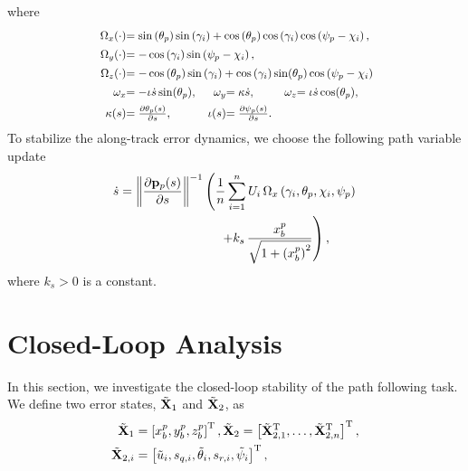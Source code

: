 where
\begin{subequations}
    \begin{align}
        \scale[0.90]{\Omega_x(\cdot)} & \mathrlap{\scale[0.90]{= \sin\left(\theta_p\right)\sin\left(\gamma_i\right) + \cos\left(\theta_p\right)\cos\left(\gamma_i\right)\cos\left(\psi_p-\chi_i\right),}} \\
        \scale[0.90]{\Omega_y(\cdot)} & \mathrlap{\scale[0.90]{= -\cos\left(\gamma_i\right)\sin\left(\psi_p - \chi_i\right),}} \\
        \scale[0.90]{\Omega_z(\cdot)} & \mathrlap{\scale[0.90]{=-\cos\left(\theta_p\right)\sin\left(\gamma_i\right) + \cos\left(\gamma_i\right)\sin(\theta_p)\cos\left(\psi_p-\chi_i\right)}} \\
        \scale[0.90]{\omega_x} & \scale[0.90]{= -\iota\dot{s}\sin(\theta_p),} &
        \scale[0.90]{\omega_y} & \scale[0.90]{= \kappa\dot{s},} &
        \scale[0.90]{\omega_z} & \scale[0.90]{= \iota\dot{s}\cos(\theta_p),} \\
        \scale[0.90]{\kappa(s)} & \scale[0.90]{= \frac{\partial \theta_p(s)}{\partial s},} &
        \scale[0.90]{\iota(s)} & \scale[0.90]{= \frac{\partial \psi_p(s)}{\partial s}.}
    \end{align}
\end{subequations}
To stabilize the along-track error dynamics, we choose the following path variable update 
\begin{equation}
    \begin{split}
        \dot{s} &= \left\|\frac{\partial \mathbf{p}_p(s)}{\partial s}\right\|^{-1} \left( \frac{1}{n}\sum_{i=1}^n U_i\,\Omega_x\left(\gamma_i, \theta_p, \chi_i, \psi_p\right)\right. \\
        & \qquad \qquad \qquad \qquad \left. + k_{s}\,\frac{x_b^p}{\sqrt{1+\left(x_b^p\right)^2}}\right),
    \end{split} \label{eq:nsb_5dof_path_update}
\end{equation}
where $k_{s} > 0$ is a constant.

\section{Closed-Loop Analysis}
\label{sec:nsb_5dof_path_stability}
In this section, we investigate the closed-loop stability of the path following task.
We define two error states, $\tilde{\mathbf{X}}_1$ and $\tilde{\mathbf{X}}_2$, as
\begin{align}
    \tilde{\mathbf{X}}_1 &= \left[x_b^p, y_b^p, z_b^p\right]^{\mathrm{T}}, 
    \tilde{\mathbf{X}}_2 = \left[\tilde{\mathbf{X}}_{2,1}^{\mathrm{T}}, \ldots, \tilde{\mathbf{X}}_{2,n}^{\mathrm{T}}\right]^{\mathrm{T}}, \label{eq:nsb_5dof_error_states} \\
    \tilde{\mathbf{X}}_{2,i} &= \left[\tilde{u}_i, s_{q,i}, \tilde{\theta}_i, s_{r,i}, \tilde{\psi}_i\right]^{\mathrm{T}},
\end{align}

